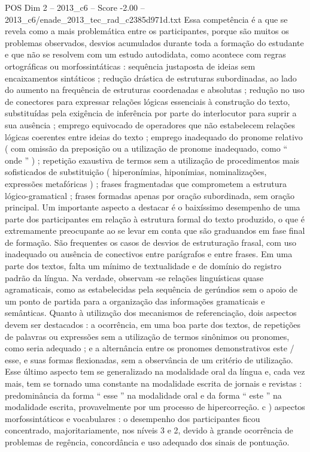 \begin{textsample}{POS Dim 2 – 2013\_c6 – Score -2.00 – 2013\_c6/enade\_2013\_tec\_rad\_c2385d971d.txt}
Essa competência é a que se revela como a mais problemática entre os participantes, porque são muitos os problemas observados, desvios acumulados durante toda a formação do estudante e que não se resolvem com um estudo autodidata, como acontece com regras ortográficas ou morfossintáticas : sequência justaposta de ideias sem encaixamentos sintáticos ; redução drástica de estruturas subordinadas, ao lado do aumento na frequência de estruturas coordenadas e absolutas ; redução no uso de conectores para expressar relações lógicas essenciais à construção do texto, substituídas pela exigência de inferência por parte do interlocutor para suprir a sua ausência ; emprego equivocado de operadores que não estabelecem relações lógicas coerentes entre ideias do texto ; emprego inadequado do pronome relativo ( com omissão da preposição ou a utilização de pronome inadequado, como “ onde ” ) ; repetição exaustiva de termos sem a utilização de procedimentos mais sofisticados de substituição ( hiperonímias, hiponímias, nominalizações, expressões metafóricas ) ; frases fragmentadas que comprometem a estrutura lógico-gramatical ; frases formadas apenas por oração subordinada, sem oração principal.
Um importante aspecto a destacar é o baixíssimo desempenho de uma parte dos participantes em relação à estrutura formal do texto produzido, o que é extremamente preocupante ao se levar em conta que são graduandos em fase final de formação.
São frequentes os casos de desvios de estruturação frasal, com uso inadequado ou ausência de conectivos entre parágrafos e entre frases.
Em uma parte dos textos, falta um mínimo de textualidade e de domínio do registro padrão da língua.
Na verdade, observam -se relações linguísticas quase agramaticais, como as estabelecidas pela sequência de gerúndios sem o apoio de um ponto de partida para a organização das informações gramaticais e semânticas.
Quanto à utilização dos mecanismos de referenciação, dois aspectos devem ser destacados : a ocorrência, em uma boa parte dos textos, de repetições de palavras ou expressões sem a utilização de termos sinônimos ou pronomes, como seria adequado ; e a alternância entre os pronomes demonstrativos este / esse, e suas formas flexionadas, sem a observância de um critério de utilização.
Esse último aspecto tem se generalizado na modalidade oral da língua e, cada vez mais, tem se tornado uma constante na modalidade escrita de jornais e revistas : predominância da forma “ esse ” na modalidade oral e da forma “ este ” na modalidade escrita, provavelmente por um processo de hipercorreção. c ) aspectos morfossintáticos e vocabulares : o desempenho dos participantes ficou concentrado, majoritariamente, nos níveis 3 e 2, devido à grande ocorrência de problemas de regência, concordância e uso adequado dos sinais de pontuação.

\end{textsample}
